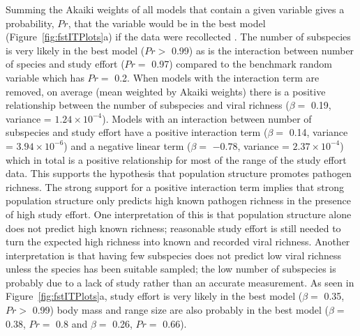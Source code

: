 Summing the Akaiki weights of all models that contain a given variable gives a probability, $Pr$, that the variable would be in the best model (Figure~\ref{fig:fstITPlots}a) if the data were recollected \cite{whittingham2006we}.
The number of subspecies is very likely in the best model ($Pr > $ 0.99) as is the interaction between number of species and study effort ($Pr = $ 0.97) compared to the benchmark random variable which has $Pr = $ 0.2.
When models with the interaction term are removed, on average (mean weighted by Akaiki weights) there is a positive relationship between the number of subspecies and viral richness ($\beta = $ 0.19, variance = \ensuremath{1.24\times 10^{-4}}).
Models with an interaction between number of subspecies and study effort have a positive interaction term ($\beta = $ 0.14, variance = \ensuremath{3.94\times 10^{-6}}) and a negative linear term ($\beta = $ \ensuremath{-0.78}, variance = \ensuremath{2.37\times 10^{-4}}) which in total is a positive relationship for most of the range of the study effort data.
This supports the hypothesis that population structure promotes pathogen richness.
The strong support for a positive interaction term implies that strong population structure only predicts high known pathogen richness in the presence of high study effort.
One interpretation of this is that population structure alone does not predict high known richness; reasonable study effort is still needed to turn the expected high richness into known and recorded viral richness.
Another interpretation is that having few subspecies does not predict low viral richness unless the species has been suitable sampled; the low number of subspecies is probably due to a lack of study rather than an accurate measurement.
As seen in Figure~\ref{fig:fstITPlots}a, study effort is very likely in the best model ($\beta = $ 0.35, $Pr > $ 0.99) body mass and range size are also probably in the best model ($\beta = $ 0.38, $Pr = $ 0.8 and $\beta = $ 0.26, $Pr = $ 0.66).



